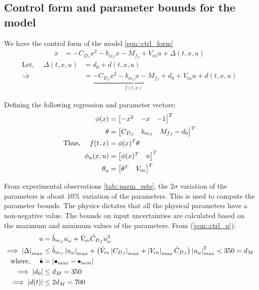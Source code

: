 \subsection{Control form and parameter bounds for the model}

We have the control form of the model \ref{eqn::ctrl_form}
\begin{align*}
    \dot x &= -C_{D_J} x^2 -b_{m_J} x - M_{f_J} + V_{in} u + \Delta(t, x, u)
\end{align*}
\begin{align}
    \text{Let, }\quad \Delta(t, x, u) &= d_0 + d(t, x, u) \\
    \therefore \dot x &= \underbrace{-C_{D_J} x^2 -b_{m_J} x - M_{f_J} + d_0}_{f(t, x)} + V_{in} u + d(t, x, u) \label{eqn::prm_ctrl_form}
\end{align}

Defining the following regression and parameter vectors:
\begin{align}
    \phi(x) &= \begin{bmatrix}  -x^2 & -x & -1 \end{bmatrix}^T \\
    \theta &= \begin{bmatrix} C_{D_J} & b_{m_J} & M_{f_J}-d_0 \end{bmatrix}^T \\
    \text{Thus, }\quad f(t, x) &= \phi(x)^T \theta\\
    \phi_u(x, u) &= \begin{bmatrix} \phi(x)^T & u \end{bmatrix}^T \\
    \theta_u &= \begin{bmatrix} \theta^T & V_{in} \end{bmatrix}^T
\end{align}

From experimental observations \ref{tab::parm_ests}, the $2\sigma$ variation of
the parameters is about $10\%$ variation of the parameters. This is used to
compute the parameter bounds. The physics dictates that
all the physical parameters have a non-negative value. The bounds on input
uncertainties are calculated based on the maximum and minimum values of the
parameters. From (\ref{eqn::ctrl_u}):
\begin{align*}
    u &= \hat b_{m_J} u_\omega + \hat V_{in} \hat C_{D_J} u_\omega^2\\
    \implies \left\lvert \Delta \right\rvert_{max} &\leq \tilde b_{m_J} \left\lvert u_\omega \right\rvert_{max} + \left( \tilde V_{in} \left\lvert C_{D_J} \right\rvert_{max} + \left\lvert V_{in} \right\rvert_{max} \tilde C_{D_J} \right)\left\lvert u_\omega \right\rvert_{max}^2  < 350 = d_M\\
    \text{where, }\quad \tilde \bullet &= \left\lvert \bullet_{max} - \bullet_{min} \right\rvert\\
    \implies \left\lvert d_0 \right\rvert &\leq d_M = 350 \\
    \implies \left\lvert d(t) \right\rvert &\leq 2 d_M = 700
\end{align*}



